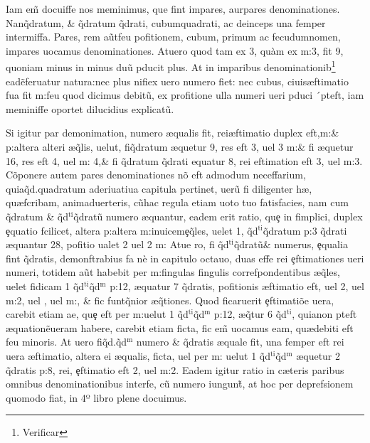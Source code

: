  Iam e\~{m} docuiffe nos meminimus, que fint impares, aurpares denominationes. Nan{\nb}\hspace{-1mm}\~{q}dratum, \& \~{q}dratum \~{q}drati, cubum\nb quadrati, ac deinceps una femper intermiffa. Pares, rem a\~{u}tfeu pofitionem, cubum, primum ac fecudumnomen, impares uocamus denominationes. Atuero quod tam ex 3, qu\`{a}m ex m:3, fit 9, quoniam minus in minus du{\ct}\~{u} pducit plus. At in imparibus denominationib\footnote[9]{Verificar} ead\~{e}feruatur natura:nec plus nifiex uero numero fiet: nec cubus, ciuis{\ae}ftimatio fua fit m:feu quod dicimus debit\~{u}, ex profitione ulla numeri ueri pduci ´pteft, iam meminiffe oportet dilucidius explicat\~{u}.
\pagestyle{capUm}

 Si igitur par demonimation, numero {\ae}qualis fit, rei{\ae}ftimatio duplex eft,m:\& p:altera{\nb} alteri {\ae}\~{q}lis, uelut, fi\~{q}dratum {\ae}quetur 9, res eft 3, uel 3 m:\& fi {\ae}quetur 16, res eft 4, uel m: 4,\& fi \~{q}dratum \~{q}drati equatur 8, rei eftimation eft 3, uel m:3. C\~{o}ponere autem pares denominationes n\~{o} eft admodum neceffarium, quia\~{q}d.quadratum aderiuatiua capitula pertinet, uer\~{u} fi diligenter h{\ae}, qu{\ae}fcribam, animaduerteris, c\~{u}hac regula etiam uoto tuo fatisfacies, nam cum \~{q}dratum \& \~{q}d\(^{\text{ti}}\)\~{q}drat\~{u} numero {\ae}quantur, eadem erit ratio, qu\c{e} in fimplici, duplex \c{e}quatio fcilicet, altera p:altera m:inuicem\que \c{e}\~{q}les, uelet 1, \~{q}d\(^{\text{ti}}\)\~{q}dratum p:3 \~{q}drati {\ae}quantur 28, pofitio ualet 2 uel 2 m: Atue ro, fi  \~{q}d\(^{\text{ti}}\)\~{q}drat\~{u}\& numerus, \c{e}qualia fint \~{q}dratis, demonftrabius fa nè in capitulo octauo, duas effe rei \c{e}ftimationes ueri numeri, totidem a\~{u}t habebit per m:fingulas fingulis correfpondentibus {\ae}\~{q}les, uelet fidicam 1 \~{q}d\(^{\text{ti}}\)\~{q}d\(^{\text{m}}\) p:12, {\ae}quatur 7 \~{q}dratis, pofitionis {\ae}ftimatio eft, uel 2, uel m:2, uel , uel m:, \& fic funt\~{q}nior {\ae}\~{q}tiones. Quod ficaruerit \c{e}ftimati\~{o}e uera, carebit etiam ae, qu\c{e} eft per m:uelut 1 \~{q}d\(^{\text{ti}}\)\~{q}d\(^{\text{m}}\) p:12, {\ae}\~{q}tur 6 \~{q}d\(^{\text{ti}}\), quianon pteft {\ae}quation\~{e}ueram habere, carebit etiam ficta, fic e\~{m} uocamus eam, qu\ae debiti eft feu minoris. At uero fi\~{q}d.\~{q}d\(^{\text{m}}\) numero \& \~{q}dratis {\ae}quale fit, una femper eft rei uera {\ae}ftimatio, altera ei {\ae}qualis, ficta, uel per m: uelut 1 \~{q}d\(^{\text{ti}}\)\~{q}d\(^{\text{m}}\) {\ae}quetur 2 \~{q}dratis p:8, rei, \c{e}ftimatio eft 2, uel m:2. Eadem igitur ratio in c{\ae}teris paribus omnibus denominationibus interfe, c\~{u} numero iungun\~{t}, at hoc per deprefsionem quomodo fiat, in 4º libro plene docuimus.

